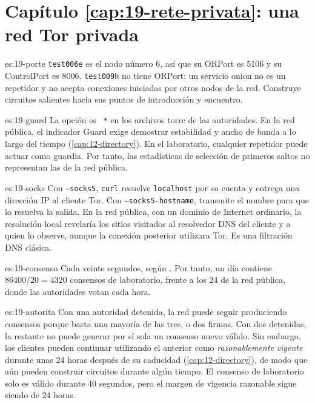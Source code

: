 \section*{Capítulo \ref{cap:19-rete-privata}: una red Tor privada}

\begin{soluzione}{es:19-porte}
\texttt{test006e} es el nodo número 6, así que su ORPort es 5106 y su ControlPort es 8006. \texttt{test009h} no tiene ORPort: un servicio onion no es un repetidor y no acepta conexiones iniciadas por otros nodos de la red. Construye circuitos salientes hacia sus puntos de introducción y encuentro.
\end{soluzione}

\begin{soluzione}{es:19-guard}
La opción es ~\texttt{*} en los archivos torrc de las autoridades. En la red pública, el indicador Guard exige demostrar estabilidad y ancho de banda a lo largo del tiempo (\cref{cap:12-directory}). En el laboratorio, cualquier repetidor puede actuar como guardia. Por tanto, las estadísticas de selección de primeros saltos no representan las de la red pública.
\end{soluzione}

\begin{soluzione}{es:19-socks}
Con \texttt{--socks5}, \texttt{curl} resuelve \texttt{localhost} por su cuenta y entrega una dirección IP al cliente Tor. Con \texttt{--socks5-hostname}, transmite el nombre para que lo resuelva la salida. En la red pública, con un dominio de Internet ordinario, la resolución local revelaría los sitios visitados al resolvedor DNS del cliente y a quien lo observe, aunque la conexión posterior utilizara Tor. Es una filtración DNS clásica.
\end{soluzione}

\begin{soluzione}{es:19-consenso}
Cada veinte segundos, según . Por tanto, un día contiene $86400/20=4320$ consensos de laboratorio, frente a los 24 de la red pública, donde las autoridades votan cada hora.
\end{soluzione}

\begin{soluzione}{es:19-autorita}
Con una autoridad detenida, la red puede seguir produciendo consensos porque basta una mayoría de las tres, o dos firmas. Con dos detenidas, la restante no puede generar por sí sola un consenso nuevo válido. Sin embargo, los clientes pueden continuar utilizando el anterior como \emph{razonablemente vigente} durante unas 24 horas después de su caducidad (\cref{cap:12-directory}), de modo que aún pueden construir circuitos durante algún tiempo. El consenso de laboratorio solo es válido durante 40 segundos, pero el margen de vigencia razonable sigue siendo de 24 horas.
\end{soluzione}


